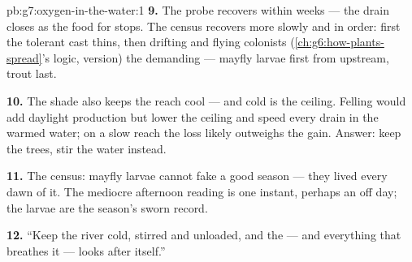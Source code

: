 \begin{solution}{pb:g7:oxygen-in-the-water:1}
\textbf{9.} The probe recovers within weeks --- the drain
closes as the food for  stops. The census
recovers more slowly and in order: first the tolerant cast
thins, then drifting and flying colonists
(\cref{ch:g6:how-plants-spread}'s logic,  version)
 the demanding  --- mayfly larvae first from
upstream, trout last.

\textbf{10.} The shade also keeps the reach cool --- and
cold is the ceiling. Felling would add daylight production
but lower the ceiling and speed every drain in the warmed
water; on a slow reach the loss likely outweighs the gain.
Answer: keep the trees, stir the water instead.

\textbf{11.} The census: mayfly larvae cannot fake a good
season --- they lived every dawn of it. The mediocre
afternoon reading is one instant, perhaps an off day; the
larvae are the season's sworn record.

\textbf{12.} ``Keep the river cold, stirred and unloaded,
and the  --- and everything that breathes it ---
looks after itself.''
\end{solution}
